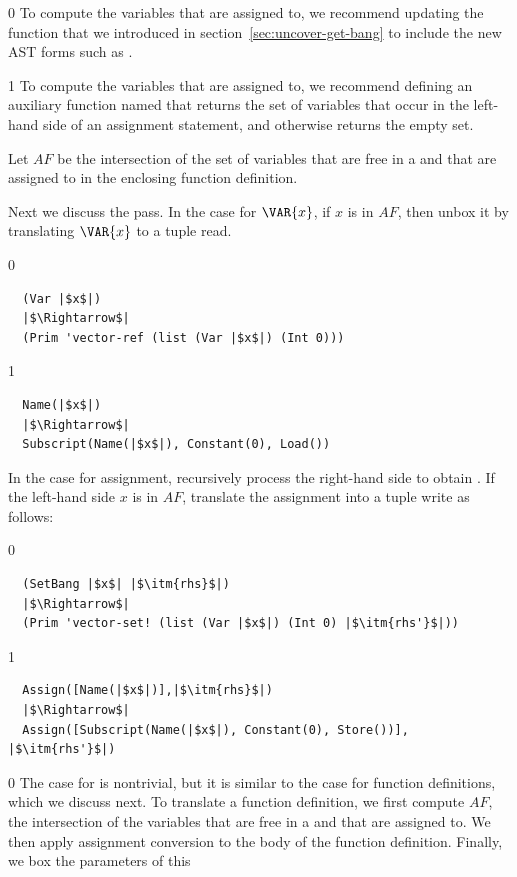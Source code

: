\documentclass[7x10]{TimesAPriori_MIT}%
\def\racketEd{0}
\def\pythonEd{1}
\def\edition{1}
\newcommand{\pythonColor}[0]{}
\numberwithin{theorem}{chapter}
\numberwithin{definition}{chapter}
\numberwithin{equation}{chapter}
\begin{document}
{\if\edition\racketEd
%
To compute the variables that are assigned to, we recommend updating
the  function that we introduced in
section~\ref{sec:uncover-get-bang} to include the new AST forms such
as .
%
\fi}
  
{\if\edition\pythonEd\pythonColor
%
To compute the variables that are assigned to, we recommend defining
an auxiliary function named  that returns
the set of variables that occur in the left-hand side of an assignment
statement, and otherwise returns the empty set.
%
\fi}

Let $\mathit{AF}$ be the intersection of the set of variables that are
free in a  and that are assigned to in the enclosing
function definition.

Next we discuss the  pass.  In the case for
$\VAR{x}$, if $x$ is in $\mathit{AF}$, then unbox it by translating
$\VAR{x}$ to a tuple read.
%
{\if\edition\racketEd
\begin{lstlisting}
  (Var |$x$|)
  |$\Rightarrow$|
  (Prim 'vector-ref (list (Var |$x$|) (Int 0)))
\end{lstlisting}
\fi}
%
{\if\edition\pythonEd\pythonColor
\begin{lstlisting}
  Name(|$x$|)
  |$\Rightarrow$|
  Subscript(Name(|$x$|), Constant(0), Load())
\end{lstlisting}
\fi}
%
\noindent In the case for assignment, recursively process the
right-hand side  to obtain .  If the left-hand side
$x$ is in $\mathit{AF}$, translate the assignment into a tuple write
as follows:
%
{\if\edition\racketEd
\begin{lstlisting}
  (SetBang |$x$| |$\itm{rhs}$|)
  |$\Rightarrow$|
  (Prim 'vector-set! (list (Var |$x$|) (Int 0) |$\itm{rhs'}$|))
\end{lstlisting}
\fi}
{\if\edition\pythonEd\pythonColor
\begin{lstlisting}
  Assign([Name(|$x$|)],|$\itm{rhs}$|)
  |$\Rightarrow$|
  Assign([Subscript(Name(|$x$|), Constant(0), Store())], |$\itm{rhs'}$|)
\end{lstlisting}
\fi}
%
{\if\edition\racketEd
The case for  is nontrivial, but it is similar to the
case for function definitions, which we discuss next.
\fi}
%
To translate a function definition, we first compute $\mathit{AF}$,
the intersection of the variables that are free in a  and
that are assigned to. We then apply assignment conversion to the body
of the function definition. Finally, we box the parameters of this
\end{document}
